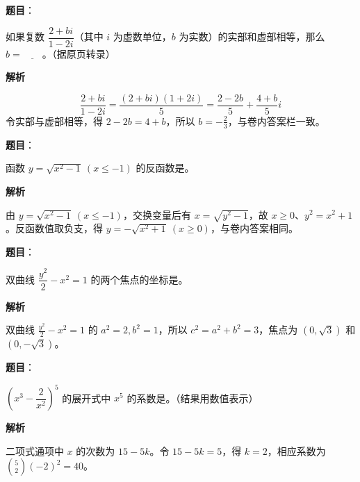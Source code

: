 \begin{answer}

\textbf{题目}：

如果复数 \(\dfrac{2+bi}{1-2i}\)（其中 \(i\) 为虚数单位，\(b\) 为实数）的实部和虚部相等，那么 \(b=\underline{\qquad}\)。（据原页转录）

\textbf{解析}

\nopagebreak[4]
\[
\frac{2+bi}{1-2i}=\frac{(2+bi)(1+2i)}5=\frac{2-2b}{5}+\frac{4+b}{5}i
\]
令实部与虚部相等，得 \(2-2b=4+b\)，所以 \(b=-\frac23\)，与卷内答案栏一致。


\end{answer}
\begin{answer}

\textbf{题目}：

函数 \(y=\sqrt{x^2-1}\ (x\le-1)\) 的反函数是\gkblank{}。

\textbf{解析}

由 \(y=\sqrt{x^2-1}\ (x\le-1)\)，交换变量后有 \(x=\sqrt{y^2-1}\)，故 \(x\ge0\)、\(y^2=x^2+1\)。反函数值取负支，得 \(y=-\sqrt{x^2+1}\ (x\ge0)\)，与卷内答案相同。


\end{answer}
\begin{answer}

\textbf{题目}：

双曲线 \(\dfrac{y^2}{2}-x^2=1\) 的两个焦点的坐标是\gkblank{}。

\textbf{解析}

双曲线 \(\frac{y^2}{2}-x^2=1\) 的 \(a^2=2,b^2=1\)，所以 \(c^2=a^2+b^2=3\)，焦点为 \((0,\sqrt3)\) 和 \((0,-\sqrt3)\)。


\end{answer}
\begin{answer}

\textbf{题目}：

\(\left(x^3-\dfrac{2}{x^2}\right)^5\) 的展开式中 \(x^5\) 的系数是\gkblank{}。（结果用数值表示）

\textbf{解析}

二项式通项中 \(x\) 的次数为 \(15-5k\)。令 \(15-5k=5\)，得 \(k=2\)，相应系数为 \(\binom52(-2)^2=40\)。


\end{answer}
